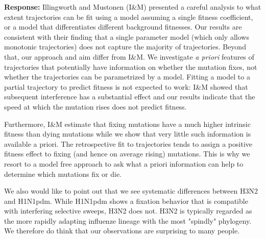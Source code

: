 \documentclass[aps,rmp,onecolumn]{revtex4-1}
\newcommand{\response}[1]{{\it {\color{response}\textbf{Response:} #1}}\vskip 5mm}
\newcommand{\responsedraft}[1]{{\it {\color{purple}\textbf{ResponseDraft:} #1}}\vskip 5mm}
\begin{document}
\response{
	Illingworth and Mustonen (I\&M) presented a careful analysis to what extent trajectories can be fit using a model assuming a single fitness coefficient, or a model that differentiates different background fitnesses.
	Our results are consistent with their finding that a single parameter model (which only allows monotonic trajectories) does not capture the majority of trajectories.
	Beyond that, our approach and aim differ from I\&M.
	We investigate \emph{a priori} features of trajectories that potentially have information on whether the mutation fixes, not whether the trajectories can be parametrized by a model.
	Fitting a model to a partial trajectory to predict fitness is not expected to work: I\&M showed that subsequent interference has a substantial effect and our results indicate that the speed at which the mutation rises does not predict fitness.

	Furthermore, I\&M estimate that fixing mutations have a much higher intrinsic fitness than dying mutations while we show that very little such information is available a priori.
	The retrospective fit to trajectories tends to assign a positive fitness effect to fixing (and hence on average rising) mutations.
	This is why we resort to a model free approach to ask what a priori information can help to determine which mutations fix or die.

    We also would like to point out that we see systematic differences between H3N2 and H1N1pdm.
    While H1N1pdm shows a fixation behavior that is compatible with interfering selective sweeps, H3N2 does not.
    H3N2 is typically regarded as the more rapidly adapting influenze lineage with the most "spindly" phylogeny.
    We therefore do think that our observations are surprising to many people.
}
\end{document}
